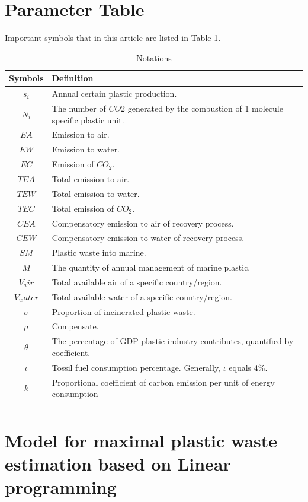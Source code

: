 \documentclass{mcmthesis}
\begin{document}
\section{Parameter Table}

Important symbols that in this article are listed in Table \ref{notation}.
\begin{table}[H] 
	\caption{Notations} 
	\center
	\begin{tabular}{cp{}}
		\toprule 
		Symbols &Definition  \\ 
		\midrule 
		$s_i $& Annual certain plastic production.  \\ 
		$N_i$ & The number of $CO2$ generated by the combustion of 1 molecule specific plastic unit. \\ 
		$EA$ & Emission to air. \\ 
		$EW$ & Emission to water.\\
		$EC$ & Emission of $CO_2$.\\
		$TEA$ & Total emission to air.\\
		$TEW$ & Total emission to water.\\
		$TEC$ & Total emission of $CO_2$.\\
		$CEA$ & Compensatory emission to air of recovery process.\\
		$CEW$ & Compensatory emission to water of recovery process.\\
		$SM$ & Plastic waste into marine.\\
		$M$ & The quantity of annual management of marine plastic.\\
		$V_air$ & Total available air of a specific country/region.\\
		$V_water$ & Total available water of a specific country/region.\\
		$\sigma$ & Proportion of incinerated plastic waste.\\
		$\mu$ & Compensate.\\
		$\theta$ & The percentage of GDP plastic industry contributes, quantified by coefficient.\\
		$\iota$ & Tossil fuel consumption percentage. Generally, $\iota$ equals 4\%.\\
		$k$ & Proportional coefficient of carbon emission per unit of
energy consumption\\
		\bottomrule 
		\label{notation}
	\end{tabular} 
\end{table}

\section{Model for maximal plastic waste estimation based on Linear programming}
\label{lp}
\end{document}
